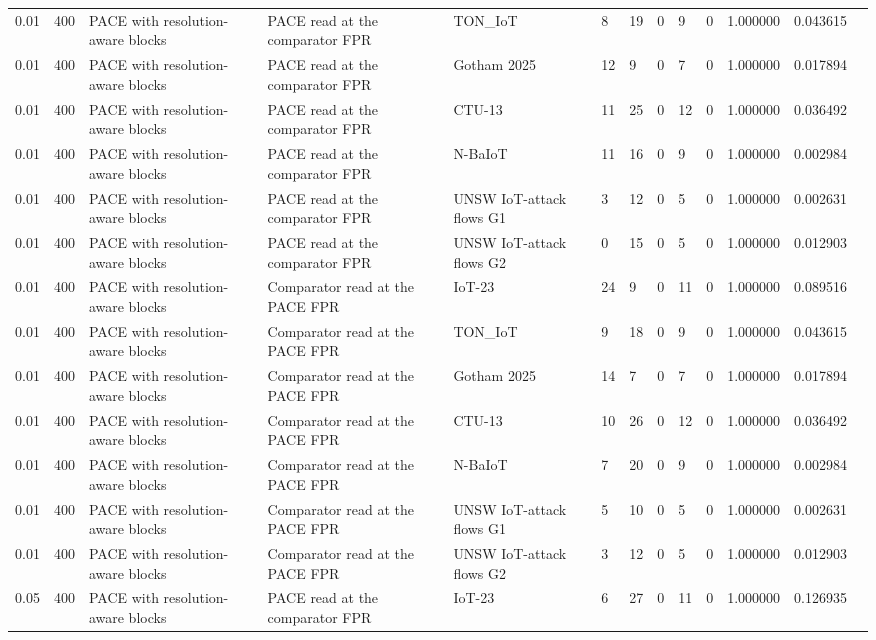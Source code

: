 \begin{tabular}{lllllllllllll}
0.01 & 400 & PACE with resolution-aware blocks & PACE read at the comparator FPR & TON\_IoT & 8 & 19 & 0 & 9 & 0 & 1.000000 & 0.043615 &  \\
0.01 & 400 & PACE with resolution-aware blocks & PACE read at the comparator FPR & Gotham 2025 & 12 & 9 & 0 & 7 & 0 & 1.000000 & 0.017894 &  \\
0.01 & 400 & PACE with resolution-aware blocks & PACE read at the comparator FPR & CTU-13 & 11 & 25 & 0 & 12 & 0 & 1.000000 & 0.036492 &  \\
0.01 & 400 & PACE with resolution-aware blocks & PACE read at the comparator FPR & N-BaIoT & 11 & 16 & 0 & 9 & 0 & 1.000000 & 0.002984 &  \\
0.01 & 400 & PACE with resolution-aware blocks & PACE read at the comparator FPR & UNSW IoT-attack flows G1 & 3 & 12 & 0 & 5 & 0 & 1.000000 & 0.002631 &  \\
0.01 & 400 & PACE with resolution-aware blocks & PACE read at the comparator FPR & UNSW IoT-attack flows G2 & 0 & 15 & 0 & 5 & 0 & 1.000000 & 0.012903 &  \\
0.01 & 400 & PACE with resolution-aware blocks & Comparator read at the PACE FPR & IoT-23 & 24 & 9 & 0 & 11 & 0 & 1.000000 & 0.089516 &  \\
0.01 & 400 & PACE with resolution-aware blocks & Comparator read at the PACE FPR & TON\_IoT & 9 & 18 & 0 & 9 & 0 & 1.000000 & 0.043615 &  \\
0.01 & 400 & PACE with resolution-aware blocks & Comparator read at the PACE FPR & Gotham 2025 & 14 & 7 & 0 & 7 & 0 & 1.000000 & 0.017894 &  \\
0.01 & 400 & PACE with resolution-aware blocks & Comparator read at the PACE FPR & CTU-13 & 10 & 26 & 0 & 12 & 0 & 1.000000 & 0.036492 &  \\
0.01 & 400 & PACE with resolution-aware blocks & Comparator read at the PACE FPR & N-BaIoT & 7 & 20 & 0 & 9 & 0 & 1.000000 & 0.002984 &  \\
0.01 & 400 & PACE with resolution-aware blocks & Comparator read at the PACE FPR & UNSW IoT-attack flows G1 & 5 & 10 & 0 & 5 & 0 & 1.000000 & 0.002631 &  \\
0.01 & 400 & PACE with resolution-aware blocks & Comparator read at the PACE FPR & UNSW IoT-attack flows G2 & 3 & 12 & 0 & 5 & 0 & 1.000000 & 0.012903 &  \\
0.05 & 400 & PACE with resolution-aware blocks & PACE read at the comparator FPR & IoT-23 & 6 & 27 & 0 & 11 & 0 & 1.000000 & 0.126935 &  \\

\end{tabular}
